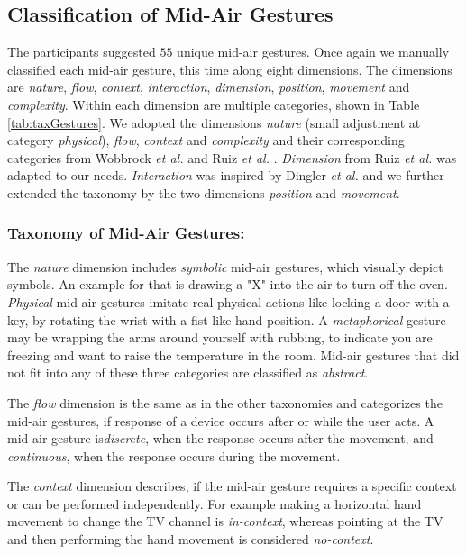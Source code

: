 \documentclass[sigchi]{acmart}
\begin{document}
	\subsection{Classification of Mid-Air Gestures}
	The participants suggested $55$ unique mid-air gestures. Once again we manually classified each mid-air gesture, this time along eight dimensions. The dimensions are \textit{nature}, \textit{flow}, \textit{context}, \textit{interaction}, \textit{dimension}, \textit{position}, \textit{movement} and \textit{complexity}. Within each dimension are multiple categories, shown in Table \ref{tab:taxGestures}. We adopted the dimensions \textit{nature} (small adjustment at category \textit{physical}), \textit{flow}, \textit{context} and \textit{complexity} and their corresponding categories from Wobbrock \textit{et al.} \citep{Wobbrock.2009} and Ruiz \textit{et al.} \citep{Ruiz.2011}. \textit{Dimension} from Ruiz \textit{et al.} \citep{Ruiz.2011} was adapted to our needs. \textit{Interaction} was inspired by Dingler \textit{et al.} \citep{Dingler.2018} and we further extended the taxonomy by the two dimensions \textit{position} and \textit{movement}.
	\subsubsection{Taxonomy of Mid-Air Gestures:}
	The \textit{nature} dimension includes \textit{symbolic} mid-air gestures, which visually depict symbols. An example for that is drawing a "X" into the air to turn off the oven. \textit{Physical} mid-air gestures imitate real physical actions like locking a door with a key, by rotating the wrist with a fist like hand position. A \textit{metaphorical} gesture may be wrapping the arms around yourself with rubbing, to indicate you are freezing and want to raise the temperature in the room. Mid-air gestures that did not fit into any of these three categories are classified as \textit{abstract}.
	
	The \textit{flow} dimension is the same as in the other taxonomies and categorizes the mid-air gestures, if response of a device occurs after or while the user acts. A mid-air gesture is\textit{discrete}, when the response occurs after the movement, and \textit{continuous}, when the response occurs during the movement. 
	
	The \textit{context} dimension describes, if the mid-air gesture requires a specific context or can be performed independently. For example making a horizontal hand movement to change the TV channel is \textit{in-context}, whereas pointing at the TV and then performing the hand movement is considered \textit{no-context}.
	
\end{document}

